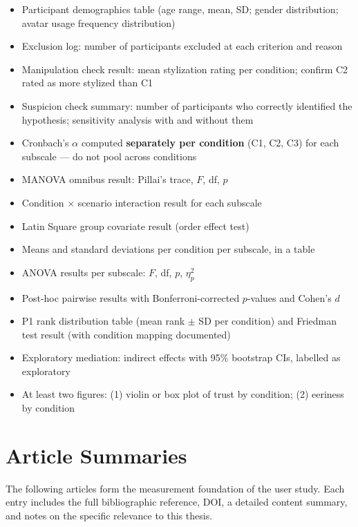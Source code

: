 \documentclass[11pt, a4paper]{article}
\begin{document}
\begin{itemize}
  \item Participant demographics table (age range, mean, SD; gender distribution; avatar usage frequency distribution)
  \item Exclusion log: number of participants excluded at each criterion and reason
  \item Manipulation check result: mean stylization rating per condition; confirm C2 rated as more stylized than C1
  \item Suspicion check summary: number of participants who correctly identified the hypothesis; sensitivity analysis with and without them
  \item Cronbach's $\alpha$ computed \textbf{separately per condition} (C1, C2, C3) for each subscale — do not pool across conditions
  \item MANOVA omnibus result: Pillai's trace, $F$, df, $p$
  \item Condition $\times$ scenario interaction result for each subscale
  \item Latin Square group covariate result (order effect test)
  \item Means and standard deviations per condition per subscale, in a table
  \item ANOVA results per subscale: $F$, df, $p$, $\eta^2_p$
  \item Post-hoc pairwise results with Bonferroni-corrected $p$-values and Cohen's $d$
  \item P1 rank distribution table (mean rank $\pm$ SD per condition) and Friedman test result (with condition mapping documented)
  \item Exploratory mediation: indirect effects with 95\% bootstrap CIs, labelled as exploratory
  \item At least two figures: (1) violin or box plot of trust by condition; (2) eeriness by condition
\end{itemize}

\newpage

\section{Article Summaries}
\label{sec:articles}

The following articles form the measurement foundation of the user study. Each entry includes the full bibliographic reference, DOI, a detailed content summary, and notes on the specific relevance to this thesis.
\end{document}
